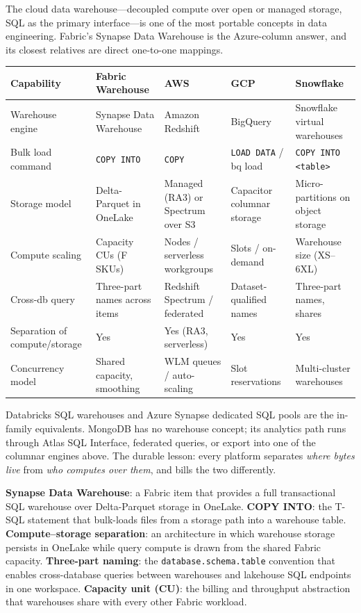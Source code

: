 \begin{crosscloud}
The cloud data warehouse---decoupled compute over open or managed storage, SQL as the primary interface---is one of the most portable concepts in data engineering. Fabric's Synapse Data Warehouse is the Azure-column answer, and its closest relatives are direct one-to-one mappings.

\vspace{2mm}
{\footnotesize
\begin{tabular}{@{}p{2.8cm}p{3.2cm}p{3.2cm}p{3.2cm}p{3.2cm}@{}}
\toprule
\textbf{Capability} & \textbf{Fabric Warehouse} & \textbf{AWS} & \textbf{GCP} & \textbf{Snowflake} \\
\midrule
Warehouse engine & Synapse Data Warehouse & Amazon Redshift & BigQuery & Snowflake virtual warehouses \\
Bulk load command & \texttt{COPY INTO} & \texttt{COPY} & \texttt{LOAD DATA} / bq load & \texttt{COPY INTO <table>} \\
Storage model & Delta-Parquet in OneLake & Managed (RA3) or Spectrum over S3 & Capacitor columnar storage & Micro-partitions on object storage \\
Compute scaling & Capacity CUs (F SKUs) & Nodes / serverless workgroups & Slots / on-demand & Warehouse size (XS--6XL) \\
Cross-db query & Three-part names across items & Redshift Spectrum / federated & Dataset-qualified names & Three-part names, shares \\
Separation of compute/storage & Yes & Yes (RA3, serverless) & Yes & Yes \\
Concurrency model & Shared capacity, smoothing & WLM queues / auto-scaling & Slot reservations & Multi-cluster warehouses \\
\bottomrule
\end{tabular}}

\vspace{1mm}
Databricks SQL warehouses and Azure Synapse dedicated SQL pools are the in-family equivalents. MongoDB has no warehouse concept; its analytics path runs through Atlas SQL Interface, federated queries, or export into one of the columnar engines above. The durable lesson: every platform separates \emph{where bytes live} from \emph{who computes over them}, and bills the two differently.
\end{crosscloud}

\begin{keyterms}
\textbf{Synapse Data Warehouse}: a Fabric item that provides a full transactional SQL warehouse over Delta-Parquet storage in OneLake. \quad
\textbf{COPY INTO}: the T-SQL statement that bulk-loads files from a storage path into a warehouse table. \quad
\textbf{Compute--storage separation}: an architecture in which warehouse storage persists in OneLake while query compute is drawn from the shared Fabric capacity. \quad
\textbf{Three-part naming}: the \texttt{database.schema.table} convention that enables cross-database queries between warehouses and lakehouse SQL endpoints in one workspace. \quad
\textbf{Capacity unit (CU)}: the billing and throughput abstraction that warehouses share with every other Fabric workload.
\end{keyterms}

